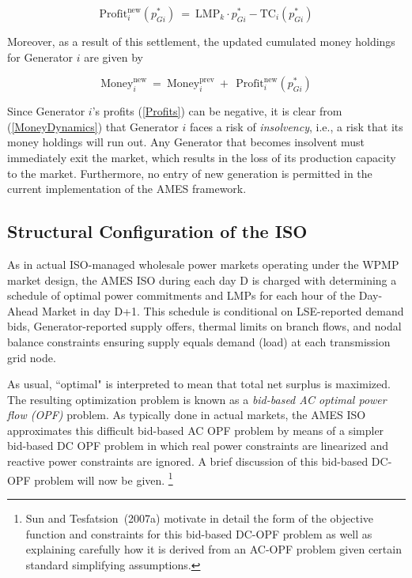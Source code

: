 \documentclass[12pt]{article}
\begin{document}
\begin{equation} \label{Profits}
	\mbox{Profit}^{\mbox{new}}_i(p^\ast_{Gi})~ = ~ \mbox{LMP}_k \cdot p^\ast_{Gi} - \mbox{TC}_i(p^\ast_{Gi})
\end{equation}


\noindent
Moreover, as a result of this settlement, the updated cumulated money holdings for Generator $i$ are given by

\begin{equation} \label{MoneyDynamics}
	\mbox{Money}_i^{\mbox{new}} ~ =  ~ \mbox{Money}_i^{\mbox{prev}}~ + ~~\mbox{Profit}^{\mbox{new}}_i(p^\ast_{Gi})
\end{equation}


\medskip
\noindent
Since Generator $i$'s profits (\ref{Profits}) can be negative, it is clear from (\ref{MoneyDynamics}) that Generator $i$ faces a risk of \textit{insolvency}, i.e., a risk that its money holdings will run out. Any Generator that becomes insolvent must immediately exit the market, which results in the loss of its production capacity to the market. Furthermore, no entry of new generation is permitted in the current implementation of the AMES framework.



\subsection{Structural Configuration of the ISO \label{ISOConfig} }

As in actual ISO-managed wholesale power markets operating under the WPMP market design, the AMES ISO during each day D is charged with determining a schedule of optimal power commitments and LMPs for each hour of the Day-Ahead Market in day D+1.  This schedule is conditional on LSE-reported demand bids, Generator-reported supply offers, thermal limits on branch flows, and nodal balance constraints ensuring supply equals demand (load) at each transmission grid node.  

As usual, ``optimal" is interpreted to mean that total net surplus is maximized.  The resulting optimization problem is known as a \textit{bid-based AC optimal power flow (OPF)\/} problem.  As typically done in actual markets, the AMES ISO approximates this difficult bid-based AC OPF problem by means of a simpler bid-based DC OPF problem in which real power constraints are linearized and reactive power constraints are ignored. A brief discussion of this bid-based DC-OPF problem will now be given.%
     \footnote{Sun and Tesfatsion~(2007a) motivate in detail the form of the objective function and constraints for this bid-based DC-OPF problem as well as explaining carefully how it is derived from an AC-OPF problem given certain standard simplifying assumptions.}
       
\end{document}
